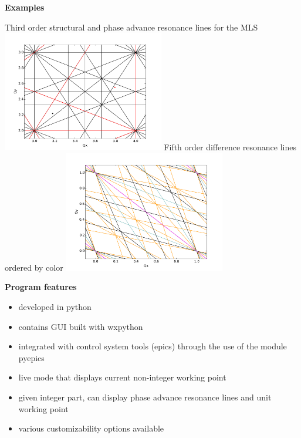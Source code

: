 \documentclass[
logosetup=topbar 
portrait,
a0paper%
]
{baposter}
\begin{document}
\begin{poster}
{
{\color{hzbblue}\bf\large Examples}
\begin{center}
\large Third order structural and phase advance resonance lines for the MLS
\includegraphics[width=200pt]{Pics/image.pdf}
\large Fifth order difference resonance lines ordered by color
\includegraphics[width=200pt]{Pics/image2.pdf}
\end{center}

{\color{hzbblue}\bf\large Program features}
\begin{itemize}

\item[\color{hzbblue}\textbullet] developed in python
\item[\color{hzbblue}\textbullet] contains GUI built with wxpython
\item[\color{hzbblue}\textbullet] integrated with control system tools (epics) through the use of the module pyepics
\item[\color{hzbblue}\textbullet] live mode that displays current non-integer working point
\item[\color{hzbblue}\textbullet] given integer part, can display phase advance resonance lines and unit working point
\item[\color{hzbblue}\textbullet] various customizability options available

\end{itemize}
}
\end{poster}
\end{document}
